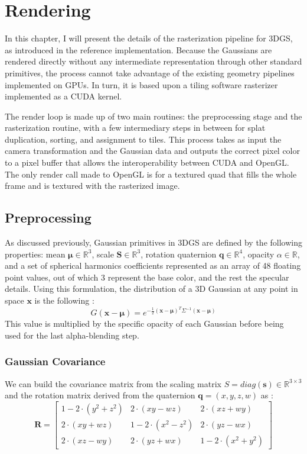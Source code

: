 \section{Rendering}
In this chapter, I will present the details of the rasterization pipeline for 3DGS, as introduced in the reference implementation. Because the Gaussians are rendered directly without any intermediate representation through other standard primitives, the process cannot take advantage of the existing geometry pipelines implemented on GPUs. In turn, it is based upon a tiling software rasterizer implemented as a CUDA kernel.

The render loop is made up of two main routines: the preprocessing stage and the rasterization routine, with a few intermediary steps in between for splat duplication, sorting, and assignment to tiles. This process takes as input the camera transformation and the Gaussian data and outputs the correct pixel color to a pixel buffer that allows the interoperability between CUDA and OpenGL. The only render call made to OpenGL is for a textured quad that fills the whole frame and is textured with the rasterized image. 

\subsection{Preprocessing}

As discussed previously, Gaussian primitives in 3DGS are defined by the following properties: mean $\bm{\mu} \in \mathbb{R}^3$, scale $\bm{S} \in \mathbb{R}^{3}$, rotation quaternion $\bm{q} \in \mathbb{R}^4$, opacity $\alpha \in \mathbb{R}$, and a set of spherical harmonics coefficients represented as an array of 48 floating point values, out of which 3 represent the base color, and the rest the specular details. Using this formulation, the distribution of a 3D Gaussian at any point in space $\bm{x}$ is the following \cite{ewa_splatting}:\[G(\bm{x} - \bm{\mu}) = e^{-\frac{1}{2}(\bm{x} - \bm{\mu})^T \Sigma^{-1} (\bm{x} - \bm{\mu})}\] This value is multiplied by the specific opacity of each Gaussian before being used for the last alpha-blending step. 

\subsubsection{Gaussian Covariance}
We can build the covariance matrix from the scaling matrix $S = diag(\bm{s}) \in \mathbb{R}^{3 \times 3}$ and the rotation matrix derived from the quaternion $\bm{q} = (x, y, z, w)$ as \cite{ye2023mathematicalsupplementtextttgsplatlibrary}:
\[
\bm{R} = \begin{bmatrix}
1 - 2 \cdot (y^2 + z^2) & 2 \cdot (xy - wz) & 2 \cdot (xz + wy)\\
2 \cdot (xy + wz) & 1 - 2 \cdot (x^2 - z^2) & 2 \cdot (yz - wx)\\
2 \cdot (xz - wy) & 2 \cdot (yz + wx) & 1 - 2 \cdot (x^2 + y^2)
\end{bmatrix}
\]


